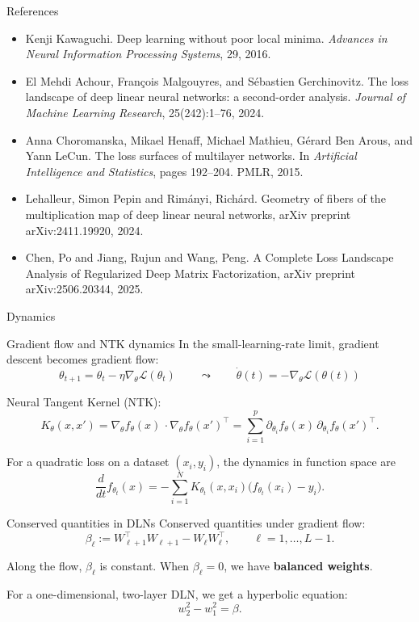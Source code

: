 \documentclass[aspectratio=169,11pt]{beamer}
\newcommand{\sectionframe}[1]{%
  \begin{frame}[plain]
    \centering
    \vfill
    {\Huge #1}
    \vfill
  \end{frame}
}
\begin{document}
\begin{frame}{References}
\begin{itemize}
    \item Kenji Kawaguchi. Deep learning without poor local minima. \textit{Advances in Neural
Information Processing Systems}, 29, 2016.
    \item El Mehdi Achour, François Malgouyres, and Sébastien Gerchinovitz. The loss
landscape of deep linear neural networks: a second-order analysis. \textit{Journal of
Machine Learning Research}, 25(242):1–76, 2024.
    \item Anna Choromanska, Mikael Henaff, Michael Mathieu, Gérard Ben Arous, and
Yann LeCun. The loss surfaces of multilayer networks. In \textit{Artificial Intelligence
and Statistics}, pages 192–204. PMLR, 2015.
    \item Lehalleur, Simon Pepin and Rim{\'a}nyi, Rich{\'a}rd. Geometry of fibers of the multiplication map of deep linear neural networks, arXiv preprint arXiv:2411.19920, 2024.
    \item Chen, Po and Jiang, Rujun and Wang, Peng. A Complete Loss Landscape Analysis of Regularized Deep Matrix Factorization, arXiv preprint arXiv:2506.20344, 2025.
\end{itemize}
\end{frame}
\sectionframe{Dynamics}
\begin{frame}{Gradient flow and NTK dynamics}
  \small
  In the small-learning-rate limit, gradient descent becomes gradient flow:
  \[
    \theta_{t+1}=\theta_t-\eta \nabla_\theta \mathcal{L}(\theta_t)
    \qquad \leadsto \qquad
    \dot{\theta}(t)=-\nabla_\theta \mathcal{L}(\theta(t))
  \]

  Neural Tangent Kernel (NTK):
  \[
    K_{\theta}(x,x')
    =
    \nabla_{\theta} f_{\theta}(x)\, \cdot
    \nabla_{\theta} f_{\theta}(x')^{\top}
    =
    \sum_{i=1}^p
    \partial_{\theta_i} f_{\theta}(x)\,
    \partial_{\theta_i} f_{\theta}(x')^{\top}.
  \]

  For a quadratic loss on a dataset $(x_i,y_i)$, the dynamics in function space are
  \[
    \frac{d}{dt}f_{\theta_t}(x)
    =
    -\sum_{i=1}^N
    K_{\theta_t}(x,x_i)\bigl(f_{\theta_t}(x_i)-y_i\bigr).
  \]
\end{frame}
\begin{frame}{Conserved quantities in DLNs}
  Conserved quantities under gradient flow:
  \[
    \beta_\ell :=
    W_{\ell+1}^{\top}W_{\ell+1}
    -
    W_{\ell}W_{\ell}^{\top},
    \qquad
    \ell=1,\ldots,L-1.
  \]

  Along the flow, $\beta_\ell$ is constant. When $\beta_\ell=0$, we have \textbf{balanced weights}.

  \vspace{0.4cm}

  For a one-dimensional, two-layer DLN, we get a hyperbolic equation:
  \[
  w_2^2-w_1^2=\beta.
  \]

  \vspace{0.4cm}
\end{frame}
\end{document}
